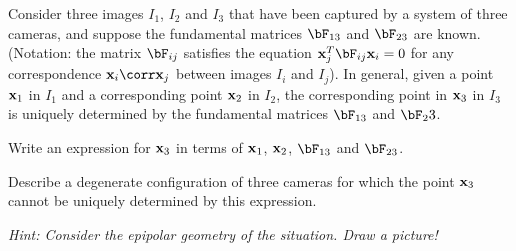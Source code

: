 \begin{problem}
  Consider three images $I_1$, $I_2$ and $I_3$ that have been captured
  by a system of three cameras, and suppose the fundamental matrices
  $\bF_{13}$ and $\bF_{23}$ are known. (Notation: the matrix $\bF_{ij}$ satisfies the
  equation $\bx_j^T \bF_{ij} \bx_i = 0$ for any correspondence
  $\bx_i \corr \bx_j$ between images $I_i$ and $I_j$).
  In general, given a point $\mathbf{x}_1$ in $I_1$ and a corresponding point $\mathbf{x}_2$ in $I_2$,
  the corresponding point in $\mathbf{x}_3$ in $I_3$ is uniquely determined
  by the fundamental matrices $\bF_{13}$ and $\bF_23$.

  \begin{enumroman}
    \item Write an expression for $\mathbf{x}_3$ in terms of $\mathbf{x}_1$, $\mathbf{x}_2$, $\bF_{13}$ and $\bF_{23}$.
      \begin{answer}
        
      \end{answer}
    \item Describe a degenerate configuration of three cameras for which the point $\mathbf{x}_3$ cannot be
      uniquely determined by this expression.
      \begin{answer}
        
      \end{answer}
  \end{enumroman}

  \emph{
    Hint: Consider the epipolar geometry of the situation. Draw a picture!
  }
\end{problem}
